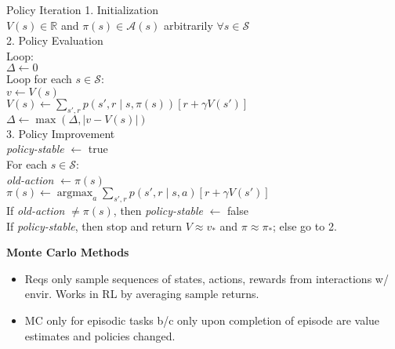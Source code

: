 \documentclass[twocolumn]{article}
\DeclareMathOperator*{\argmax}{argmax}
\begin{document}
\begin{mydef}{Policy Iteration}{}
    1. Initialization \\
    $V(s) \in \mathbb R$ and $\pi(s) \in \mathcal A(s)$ arbitrarily $\forall s \in \mathcal S$ \\
    
    2. Policy Evaluation \\
    Loop: \\
        \hspace*{2em}$\Delta \leftarrow 0$ \\
        \hspace*{2em}Loop for each $s \in \mathcal S:$ \\
            \hspace*{4em}$v \leftarrow V(s)$ \\
            \hspace*{4em}$V(s) \leftarrow \sum_{s', r} p(s', r \mid s, \pi(s)) [r + \gamma V(s')]$ \\
            \hspace*{4em}$\Delta \leftarrow \max(\Delta, |v - V(s)|)$ \\
    
    3. Policy Improvement \\
    \textit{policy-stable} $\leftarrow$ true \\
    For each $s \in \mathcal S$: \\
        \hspace*{2em}\textit{old-action} $\leftarrow \pi(s)$ \\
        \hspace*{2em}$\pi(s) \leftarrow \argmax_a \sum_{s', r} p(s', r \mid s,a)[r + \gamma V(s')]$ \\
        \hspace*{2em}If \textit{old-action} $\neq \pi(s)$, then \textit{policy-stable} $\leftarrow$ false \\
    If \textit{policy-stable}, then stop and return $V \approx v_*$ and $\pi \approx \pi_*$; else go to 2.
\end{mydef}

\newpage

\textbf{Monte Carlo Methods}

\vspace{-.5em}\begin{itemize}
    \item Reqs only sample sequences of states, actions, rewards from interactions w/ envir. Works in RL by averaging sample returns.
    \item MC only for episodic tasks b/c only upon completion of episode are value estimates and policies changed.
\end{itemize} \vspace{-.5em}
\end{document}
